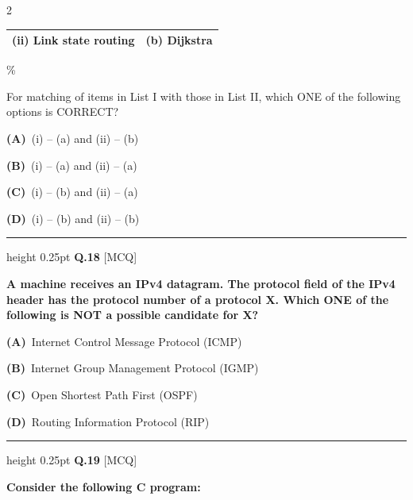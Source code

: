 \documentclass[a4paper,10pt,twoside]{article}
\begin{document}
\begin{multicols}{2}
{\begin{center}
{\begin{tabular}{|l|l|}
(ii) Link state routing & (b) Dijkstra \\ \hline
\end{tabular}\%
}\end{center}
\par\smallskip
For matching of items in List I with those in List II, which ONE of the following options is CORRECT? \par}
\par\vspace{2pt}\noindent
\textbf{(A)}~(i) -- (a) and (ii) -- (b)\par\vspace{2pt}\noindent
\textbf{(B)}~(i) -- (a) and (ii) -- (a)\par\vspace{2pt}\noindent
\textbf{(C)}~(i) -- (b) and (ii) -- (a)\par\vspace{2pt}\noindent
\textbf{(D)}~(i) -- (b) and (ii) -- (b)
\par\vspace{6pt}\hrule height 0.25pt\vspace{6pt}
\noindent\textbf{Q.18} \hfill {\footnotesize\textsf{[MCQ]}}
\par\vspace{2pt}
{\bfseries A machine receives an IPv4 datagram. The protocol field of the IPv4 header has the protocol number of a protocol X. Which ONE of the following is NOT a possible candidate for X? \par}
\par\vspace{2pt}\noindent
\textbf{(A)}~Internet Control Message Protocol (ICMP)\par\vspace{2pt}\noindent
\textbf{(B)}~Internet Group Management Protocol (IGMP)\par\vspace{2pt}\noindent
\textbf{(C)}~Open Shortest Path First (OSPF)\par\vspace{2pt}\noindent
\textbf{(D)}~Routing Information Protocol (RIP)
\par\vspace{6pt}\hrule height 0.25pt\vspace{6pt}
\noindent\textbf{Q.19} \hfill {\footnotesize\textsf{[MCQ]}}
\par\vspace{2pt}
{\bfseries Consider the following C program:
 \par}\begin{lstlisting}[language=C, basicstyle=\scriptsize\ttfamily, frame=single, rulecolor=\color{black!40}, tabsize=2, breaklines=true, aboveskip=4pt, belowskip=4pt]

\end{lstlisting}
\end{multicols}
\end{document}
